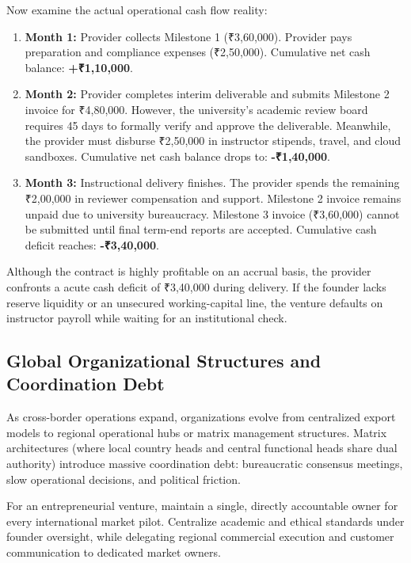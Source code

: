 Now examine the actual operational cash flow reality:
\begin{enumerate}
\item \textbf{Month 1:} Provider collects Milestone 1 (₹3,60,000). Provider pays preparation and compliance expenses (₹2,50,000). Cumulative net cash balance: \textbf{+₹1,10,000}.
\item \textbf{Month 2:} Provider completes interim deliverable and submits Milestone 2 invoice for ₹4,80,000. However, the university's academic review board requires 45 days to formally verify and approve the deliverable. Meanwhile, the provider must disburse ₹2,50,000 in instructor stipends, travel, and cloud sandboxes. Cumulative net cash balance drops to: \textbf{-₹1,40,000}.
\item \textbf{Month 3:} Instructional delivery finishes. The provider spends the remaining ₹2,00,000 in reviewer compensation and support. Milestone 2 invoice remains unpaid due to university bureaucracy. Milestone 3 invoice (₹3,60,000) cannot be submitted until final term-end reports are accepted. Cumulative cash deficit reaches: \textbf{-₹3,40,000}.
\end{enumerate}
Although the contract is highly profitable on an accrual basis, the provider confronts a acute cash deficit of ₹3,40,000 during delivery. If the founder lacks reserve liquidity or an unsecured working-capital line, the venture defaults on instructor payroll while waiting for an institutional check.

\subsection{Global Organizational Structures and Coordination Debt}
\label{sec:global_org_structures_coordination_debt}

As cross-border operations expand, organizations evolve from centralized export models to regional operational hubs or matrix management structures. Matrix architectures (where local country heads and central functional heads share dual authority) introduce massive coordination debt: bureaucratic consensus meetings, slow operational decisions, and political friction.

For an entrepreneurial venture, maintain a single, directly accountable owner for every international market pilot. Centralize academic and ethical standards under founder oversight, while delegating regional commercial execution and customer communication to dedicated market owners.

